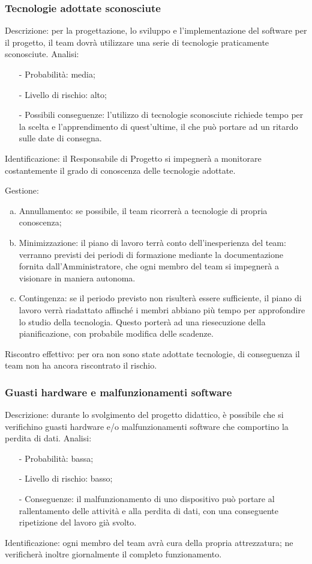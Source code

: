 \documentclass[../analisi_dei_rischi.tex]{subfiles}
\begin{document}
\subsubsection{Tecnologie adottate sconosciute}
	Descrizione: per la progettazione, lo sviluppo e l’implementazione del software per il progetto, il team dovrà utilizzare una serie di tecnologie praticamente sconosciute.
	Analisi:
	\begin{itemize}
		\item[-] Probabilità: media;
		\item[-] Livello di rischio: alto;
		\item[-] Possibili conseguenze: l’utilizzo di tecnologie sconosciute richiede tempo per la scelta e l’apprendimento di quest’ultime, il che può portare ad un ritardo sulle date di consegna.
	\end{itemize}
	
	Identificazione: il Responsabile di Progetto si impegnerà a monitorare costantemente il grado di conoscenza delle tecnologie adottate.
	
	Gestione:
	\begin{enumerate}[(a)]
		\item Annullamento: se possibile, il team ricorrerà a tecnologie di propria conoscenza;
		\item Minimizzazione: il piano di lavoro terrà conto dell’inesperienza del team: verranno previsti dei periodi di formazione mediante la documentazione fornita dall’Amministratore, che ogni membro del team si impegnerà a visionare in maniera autonoma.
		\item Contingenza: se il periodo previsto non risulterà essere sufficiente, il piano di lavoro verrà riadattato affinché i membri abbiano più tempo per approfondire lo studio della tecnologia. Questo porterà ad una riesecuzione della pianificazione, con probabile modifica delle scadenze.
	\end{enumerate} 
	Riscontro effettivo: per ora non sono state adottate tecnologie, di conseguenza il team non ha ancora riscontrato il rischio.

	\subsubsection{Guasti hardware e malfunzionamenti software}
	Descrizione: durante lo svolgimento del progetto didattico, è possibile che si verifichino guasti hardware e/o malfunzionamenti software che comportino la perdita di dati.
	Analisi:
	\begin{itemize}
		\item[-] Probabilità: bassa;
		\item[-] Livello di rischio: basso;
		\item[-] Conseguenze: il malfunzionamento di uno dispositivo può portare al rallentamento delle attività e alla perdita di dati, con una conseguente ripetizione del lavoro già svolto.
	\end{itemize}
	Identificazione: ogni membro del team avrà cura della propria attrezzatura; ne verificherà inoltre giornalmente il completo funzionamento.
	
\end{document}
